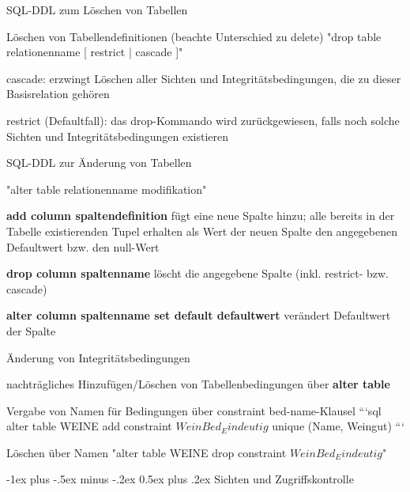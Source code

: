 \documentclass[a4paper]{article}
\makeatletter
\renewcommand{\section}{\@startsection{section}{1}{0mm}%
                                {-1ex plus -.5ex minus -.2ex}%
                                {0.5ex plus .2ex}%
                                {\normalfont\large\bfseries}}
\makeatother
\begin{document}
\begin{multicols}{3}
\begin{itemize*}
    \begin{itemize*}
        \item SQL-DDL zum Löschen von Tabellen
        \begin{itemize*}
            \item Löschen von Tabellendefinitionen (beachte Unterschied zu delete)
            "drop table relationenname [ restrict | cascade ]"
            \item cascade: erzwingt Löschen aller Sichten und Integritätsbedingungen, die zu dieser Basisrelation gehören
            \item restrict (Defaultfall): das drop-Kommando wird zurückgewiesen, falls noch solche Sichten und Integritätsbedingungen existieren
        \end{itemize*}
        \item SQL-DDL zur Änderung von Tabellen
        \begin{itemize*}
            \item "alter table relationenname modifikation"
            \item \textbf{add column spaltendefinition} fügt eine neue Spalte hinzu; alle bereits in der Tabelle existierenden Tupel erhalten als Wert der neuen Spalte den angegebenen Defaultwert bzw. den null-Wert
            \item \textbf{drop column spaltenname} löscht die angegebene Spalte (inkl. restrict- bzw. cascade)
            \item \textbf{alter column spaltenname set default defaultwert} verändert Defaultwert der Spalte
        \end{itemize*}
        \item Änderung von Integritätsbedingungen
        \begin{itemize*}
            \item nachträgliches Hinzufügen/Löschen von Tabellenbedingungen über \textbf{alter table}
            \item Vergabe von Namen für Bedingungen über constraint bed-name-Klausel
            ```sql
            alter table WEINE
            add constraint $WeinBed_Eindeutig$
            unique (Name, Weingut)
            ```
            \item Löschen über Namen "alter table WEINE drop constraint $WeinBed_Eindeutig$"
        \end{itemize*}
    \end{itemize*}

    \section{Sichten und Zugriffskontrolle}

\end{itemize*}
\end{multicols}
\end{document}
